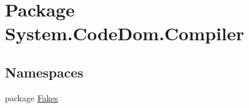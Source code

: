 \hypertarget{namespace_system_1_1_code_dom_1_1_compiler}{\section{Package System.\-Code\-Dom.\-Compiler}
\label{namespace_system_1_1_code_dom_1_1_compiler}
}
\subsection*{Namespaces}
\begin{DoxyCompactItemize}
\item 
package \hyperlink{namespace_system_1_1_code_dom_1_1_compiler_1_1_fakes}{Fakes}
\end{DoxyCompactItemize}
